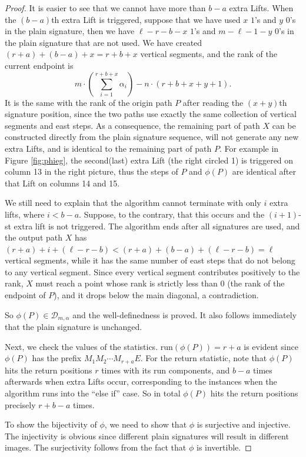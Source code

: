 \documentclass[11pt,a4paper,reqno]{article}
\newcommand{\fref}[1]{Figure \ref{fig:#1}}
\newcommand{\DD}{\mathcal{D}}
\newcommand{\run}{\mathrm{run}}
\newcommand{\al}{\alpha}
\newcommand{\LiLan}{}
\begin{document}
{\begin{proof}
{        It is easier to see that we cannot have more than $b-a$ extra Lifts. When the $(b-a)$th extra Lift is triggered, suppose that we have used $x$ $1$'s and $y$ $0$'s in the plain signature, then we have $\ell-r-b-x$ $1$'s and $m-\ell-1-y$ $0$'s in the plain signature that are not used. We have created $(r+a)+(b-a)+x = r+b+x$ vertical segments, and the rank of the current endpoint is 
        \[
        m\cdot\left(\sum_{i=1}^{r+b+x}\al_i\right)-n\cdot (r+b+x+y+1).\] It is the same with the rank of the origin path $P$ after reading the $(x+y)$th signature position, since the two paths use exactly the same collection of vertical segments and east steps. As a consequence, the remaining part of path $X$ can be constructed directly from the plain signature sequence, will not generate any new extra Lifts, and is identical to the remaining part of path $P$. For example in \fref{phieg}, the second(last) extra Lift (the right circled 1) is triggered on column 13 in the right picture, thus the steps of $P$ and $\phi(P)$ are identical after that Lift on columns 14 and 15.

        We still need to explain that the algorithm cannot terminate with only $i$ extra lifts, where $i<b-a$.
        Suppose, to the contrary, that this occurs and the $(i+1)$-st extra lift is not triggered.
        The algorithm ends after all signatures are used, and the output path $X$ has 
        $(r+a)+i+(\ell-r-b)<(r+a)+(b-a)+(\ell-r-b)=\ell$ vertical segments, while it has the same number of east steps that do not belong to any vertical segment.
        Since every vertical segment contributes positively to the rank,
        $X$ must reach a point whose rank is strictly less than $0$ (the rank of the endpoint of $P$),
        and it drops below the main diagonal, a contradiction. }So $\phi(P)\in\DD_{m,\al}$ and the well-definedness is proved. It also follows immediately that the {\LiLan plain} signature is unchanged.
        


		Next, we check the values of the statistics. $\run(\phi(P))=r+a$ is evident since $\phi(P)$ has the prefix $M_1M_2\cdots M_{r+a}E$. For the return statistic, note that $\phi(P)$ hits the return positions $r$ times with its run components, and $b-a$ times afterwards when extra Lifts occur, corresponding to the instances when the algorithm runs into the ``else if'' case. So in total $\phi(P)$ hits the return positions precisely $r+b-a$ times. 

		
		
		To show the bijectivity of $\phi$, we need to show that $\phi$ is surjective and injective. The injectivity is obvious since different {\LiLan plain} signatures will result in different images. The surjectivity follows from the fact that $\phi$ is invertible. 


\end{proof}}
\end{document}
